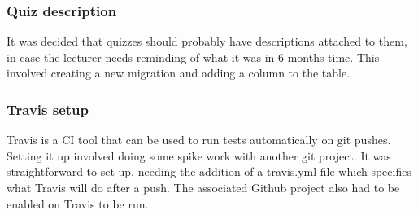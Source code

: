 \subsubsection{Quiz description}
It was decided that quizzes should probably have descriptions attached to them, in case the lecturer needs reminding of what it was in 6 months time. This involved creating a new migration and adding a column to the table.
\subsubsection{Travis setup}
Travis is a CI tool that can be used to run tests automatically on git pushes. Setting it up involved doing some spike work with another git project. It was straightforward to set up, needing the addition of a travis.yml file which specifies what Travis will do after a push. The associated Github project also had to be enabled on Travis to be run.
\newpage
